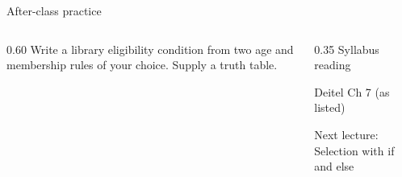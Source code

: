 \documentclass[10pt,aspectratio=169]{beamer}
\begin{document}
\begin{frame}[fragile,t]{After-class practice}
\begin{columns}[T,onlytextwidth]\begin{column}{0.60\textwidth}
Write a library eligibility condition from two age and membership rules of your choice. Supply a truth table.
\end{column}\begin{column}{0.35\textwidth}\small
Syllabus reading\par Deitel Ch 7 (as listed)

Next lecture: Selection with if and else
\end{column}\end{columns}
\end{frame}
\end{document}
